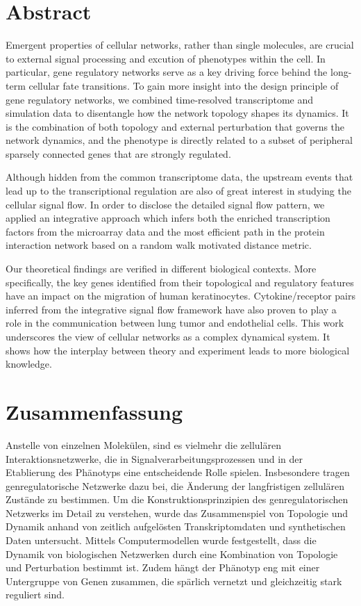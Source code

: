 \chapter*{Abstract}


Emergent properties of cellular networks, rather than single molecules, 
are crucial to external signal processing and excution of phenotypes
within the cell. In particular, gene regulatory networks serve as a key
driving force behind the long-term cellular fate transitions. To gain more
insight into the design principle of gene regulatory networks, we combined
time-resolved transcriptome and simulation data to disentangle how the
network topology shapes its dynamics. It is the combination of both topology
and external perturbation that governs the network dynamics, and 
the phenotype is directly related to a subset of
peripheral sparsely connected genes that are strongly regulated. 

Although hidden from the common transcriptome data, 
the upstream events that lead up to the 
transcriptional regulation are also of great interest in studying the 
cellular signal flow. In order to disclose the detailed signal flow pattern,
we applied an integrative approach which infers both the enriched 
transcription factors from the microarray data and the most efficient path
in the protein interaction network based on a random walk motivated distance
metric.

Our theoretical findings are verified in different biological contexts. More
specifically, the key genes identified from their topological and regulatory
features have an impact on the migration of human keratinocytes. 
Cytokine/receptor pairs inferred from the integrative signal flow framework
have also proven to play a role in the communication between lung tumor
and endothelial cells. This work underscores the view of
cellular networks as a complex dynamical system.
It shows how the interplay between theory
and experiment leads to more biological knowledge.

\chapter*{Zusammenfassung}


Anstelle von einzelnen Molek\"ulen,
sind es vielmehr die zellul\"aren Interaktionsnetzwerke,
die in Signalverarbeitungsprozessen und in der Etablierung des
Ph\"anotyps eine entscheidende Rolle spielen. 
Insbesondere tragen genregulatorische Netzwerke
dazu bei, die \"Anderung der langfristigen zellul\"aren
Zust\"ande zu bestimmen. Um die Konstruktionsprinzipien des
genregulatorischen Netzwerks im
Detail zu verstehen, wurde das Zusammenspiel von Topologie
und Dynamik anhand von zeitlich 
aufgel\"osten Transkriptomdaten und synthetischen Daten
untersucht.
Mittels Computermodellen wurde festgestellt, dass
die Dynamik von biologischen Netzwerken durch eine 
Kombination von
Topologie und Perturbation bestimmt ist.
Zudem h\"angt der Ph\"anotyp eng mit einer Untergruppe
von Genen zusammen, die sp\"arlich vernetzt und gleichzeitig
stark reguliert sind. 

